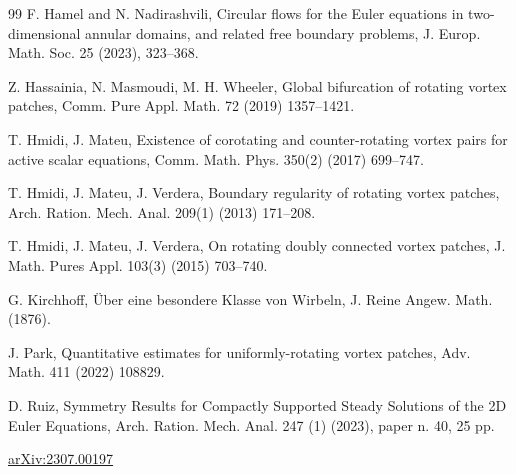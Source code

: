 \documentclass[11pt,oneside]{amsart}
\theoremstyle{definition}
\numberwithin{equation}{section}
\begin{document}
\begin{thebibliography}{99}
F. Hamel and N. Nadirashvili, Circular flows for the Euler equations in two-dimensional annular domains, and related free boundary problems, J. Europ. Math. Soc. 25 (2023), 323--368.

Z. Hassainia, N. Masmoudi, M. H. Wheeler, Global bifurcation of rotating vortex patches, Comm. Pure Appl. Math. {72} (2019) 1357--1421.

T. Hmidi, J. Mateu, Existence of corotating and counter-rotating vortex pairs for active scalar equations, Comm. Math. Phys. 350(2) (2017) 699--747.

T. Hmidi, J. Mateu, J. Verdera, Boundary regularity of rotating vortex patches, Arch. Ration. Mech. Anal. 209(1) (2013) 171--208.

T. Hmidi, J. Mateu, J. Verdera, On rotating doubly connected vortex patches, J. Math. Pures Appl. 103(3) (2015) 703--740.

G. Kirchhoff, \"Uber eine besondere Klasse von Wirbeln, J. Reine Angew. Math. (1876).


J. Park, Quantitative estimates for uniformly-rotating vortex patches, Adv. Math. 411 (2022) 108829.


 D. Ruiz, Symmetry Results for Compactly Supported Steady Solutions of the 2D Euler Equations, Arch. Ration. Mech. Anal. 247 (1) (2023), paper n. 40, 25 pp.


 \href{https://arxiv.org/abs/2307.00197.}{arXiv:2307.00197}

\end{thebibliography}
 
\end{document}
